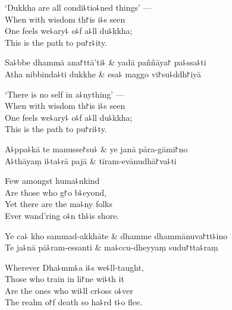 \begin{english}
  `Dukkha are all condi꜕tio꜕ned things' ---\\
  When with wisdom th꜓is i꜕s seen\\
  One feels we꜕ary꜕ o꜕f a꜕ll du꜕kkha;\\
  This is the path to pu꜓r꜕ity.
\end{english}

\begin{twochants}
  Sa꜕bbe dhammā ana꜓ttā'ti꜕ & yadā paññāya꜓ pa꜕ssa꜕ti \\
  Atha nibbinda꜕ti dukkhe & esa꜕ maggo vi꜓su꜕ddh꜓iyā \\
\end{twochants}

\begin{english}
  `There is no self in a꜕nything' ---\\
  When with wisdom th꜓is i꜕s seen\\
  One feels we꜕ary꜕ o꜕f a꜕ll du꜕kkha;\\
  This is the path to pu꜓ri꜕ty.
\end{english}

\begin{twochants}
  A꜕ppa꜕kā te manusse꜓su꜕ & ye janā pāra-gāmi꜓no \\
  A꜕thāyaṃ i꜕ta꜕rā pajā & tīram-evānudhā꜓va꜕ti \\
\end{twochants}

\begin{english}
  Few amongst huma꜕nkind\\
  Are those who g꜓o b꜕eyond,\\
  Yet there are the ma꜕ny folks\\
  Ever wand'ring o꜕n th꜕is shore.
\end{english}

\begin{twochants}
  Ye ca꜕ kho sammad-akkhāte & dhamme dhammānuva꜓tt꜕ino \\
  Te ja꜕nā pā꜕ram-essanti & ma꜕ccu-dheyyaṃ sudu꜓tta꜕raṃ \\
\end{twochants}

\begin{english}
  Wherever Dha꜕mm꜕a i꜕s we꜕ll-taught,\\
  Those who train in li꜓ne wi꜕th it\\
  Are the ones who wi꜕ll cr꜕oss o꜕ver\\
  The realm o꜓f death so ha꜕rd t꜕o flee.
\end{english}


